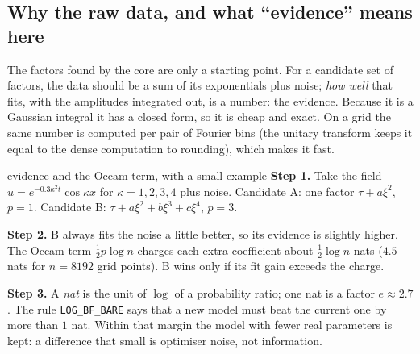 \subsection{Why the raw data, and what ``evidence'' means here}
The factors found by the core are only a starting point. For a candidate set of factors, the data should be a sum of its exponentials plus noise; \emph{how well} that fits, with the amplitudes integrated out, is a number: the evidence. Because it is a Gaussian integral it has a closed form, so it is cheap and exact. On a grid the same number is computed per pair of Fourier bins (the unitary transform keeps it equal to the dense computation to rounding), which makes it fast.

\begin{explained}{evidence and the Occam term, with a small example}
\textbf{Step 1.} Take the field $u=e^{-0.3\kappa^2t}\cos\kappa x$ for $\kappa=1,2,3,4$ plus noise. Candidate A: one factor $\tau+a\xi^2$, $p=1$. Candidate B: $\tau+a\xi^2+b\xi^3+c\xi^4$, $p=3$.

\medskip\textbf{Step 2.} B always fits the noise a little better, so its evidence is slightly higher. The Occam term $\tfrac12p\log n$ charges each extra coefficient about $\tfrac12\log n$ nats ($4.5$ nats for $n=8192$ grid points). B wins only if its fit gain exceeds the charge.

\medskip\textbf{Step 3.} A \emph{nat} is the unit of $\log$ of a probability ratio; one nat is a factor $e\approx2.7$. The rule \texttt{LOG\_BF\_BARE} says that a new model must beat the current one by more than $1$ nat. Within that margin the model with fewer real parameters is kept: a difference that small is optimiser noise, not information.
\end{explained}

